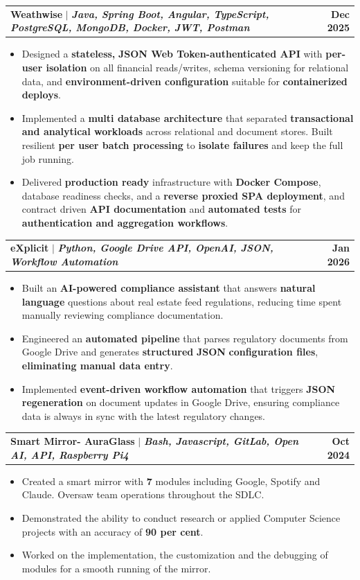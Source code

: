 \documentclass[letterpaper,11pt]{article}
\makeatletter
\newcommand{\resumeItem}[1]{
  \item\small{
    {#1 \vspace{-1pt}}
  }
}
\newcommand{\resumeProjectHeading}[2]{
    \item
    \begin{tabularx}{\textwidth}{@{}Xr@{}}
      \small#1 & \textbf{\small #2}\\
    \end{tabularx}\vspace{-4pt}
}
\newcommand{\resumeItemListStart}{\begin{itemize}[leftmargin=0.15in, topsep=2pt, itemsep=1pt, parsep=0pt, partopsep=0pt]}
\newcommand{\resumeItemListEnd}{\end{itemize}\vspace{-1pt}}
\makeatother
\begin{document}
      \resumeProjectHeading
          {\textbf{Weathwise} $|$ \emph{\textbf{Java, Spring Boot, Angular, TypeScript, PostgreSQL, MongoDB, Docker, JWT, Postman}}}{Dec 2025}
          \resumeItemListStart
            \resumeItem{Designed a \textbf{stateless, }\textbf{JSON Web Token-authenticated API} with \textbf{per-user isolation} on all financial reads/writes, schema versioning for relational data, and \textbf{environment-driven configuration} suitable for \textbf{containerized deploys}.}
            \resumeItem{Implemented a \textbf{multi database architecture} that separated \textbf{transactional and analytical workloads} across relational and document stores. Built resilient \textbf{per user batch processing} to \textbf{isolate failures} and keep the full job running.}
            \resumeItem{Delivered \textbf{production ready }infrastructure with \textbf{Docker Compose}, database readiness checks, and a \textbf{reverse proxied SPA deployment}, and contract driven \textbf{API documentation }and \textbf{automated tests} for \textbf{authentication and aggregation workflows}.}
          \resumeItemListEnd
          \resumeProjectHeading
{\textbf{eXplicit} $|$ 
\emph{\textbf{Python, Google Drive API, OpenAI, JSON, 
Workflow Automation}}}{Jan 2026}
\resumeItemListStart
    \resumeItem{Built an \textbf{AI-powered compliance assistant} that answers 
    \textbf{natural language} questions about real estate feed regulations, 
    reducing time spent manually reviewing compliance documentation.}
    \resumeItem{Engineered an \textbf{automated pipeline} that parses regulatory 
    documents from Google Drive and generates \textbf{structured} \textbf{JSON }
    \textbf{configuration files}, \textbf{eliminating manual data entry}.}
    \resumeItem{Implemented \textbf{event-driven workflow automation} that 
    triggers \textbf{JSON regeneration} on document updates in Google Drive, 
    ensuring compliance data is always in sync with the latest 
    regulatory changes.}
\resumeItemListEnd

      \resumeProjectHeading
          {\textbf{Smart Mirror- AuraGlass} $|$ \emph{\textbf{Bash, Javascript, GitLab, Open AI, API, Raspberry Pi4}}}{Oct 2024}
          \resumeItemListStart
            \resumeItem{Created a smart mirror with \textbf{7} modules including Google, Spotify and Claude. Oversaw team operations throughout the SDLC.}
            \resumeItem{Demonstrated the ability to conduct research or applied Computer Science projects with an accuracy of \textbf{90 per cent}.}
            \resumeItem{Worked on the implementation, the customization and the debugging of modules for a smooth running of the mirror.}
          \resumeItemListEnd
          \vspace{-1pt}
          
\end{document}

